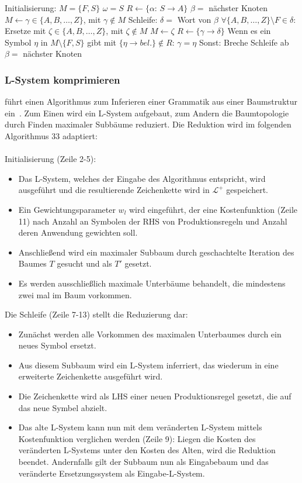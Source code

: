 \begin{algorithm}[caption={Inferieren eines L-Systems aus einer Baumstruktur}, label={alg2}]
    Initialisierung:
        $M=\{F,S\}$
        $\omega=S$
        $R \gets \{\alpha$: $S \rightarrow A\}$
        $\beta=$ nächster Knoten
        $M \gets \gamma \in \{A,B,\dots,Z\}$, mit $\gamma \notin M$
    Schleife:
        $\delta=$ Wort von $\beta$
        $\forall \{A,B,\dots,Z\} \setminus F \in \delta:$
        Ersetze mit $\zeta \in \{A,B,\dots,Z\}$, mit $\zeta \notin M$
        $M \gets \zeta$
        $R \gets \{\gamma\rightarrow\delta\}$
        Wenn es ein Symbol $\eta$ in $M\setminus\{F,S\}$ gibt mit $\{\eta \rightarrow bel.\} \notin R$:
            $\gamma=\eta$
        Sonst:
            Breche Schleife ab
        $\beta=$ nächster Knoten
\end{algorithm}

\subsubsection*{L-System komprimieren}
\citeauthor{guo_2020} führt einen Algorithmus zum Inferieren einer Grammatik aus einer Baumstruktur ein~\cite{guo_2020}.
Zum Einen wird ein L-System aufgebaut, zum Andern die Baumtopologie durch Finden maximaler Subbäume reduziert.
Die Reduktion wird im folgenden Algorithmus 33 adaptiert:\\~\\
Initialisierung (Zeile 2-5):
\begin{itemize}
    \item Das L-System, welches der Eingabe des Algorithmus entspricht, wird ausgeführt und
    die resultierende Zeichenkette wird in $\mathcal{L^+}$ gespeichert.
    \item Ein Gewichtungsparameter $w_l$ wird eingeführt, der eine Kostenfunktion (Zeile 11) nach Anzahl an Symbolen
    der RHS von Produktionsregeln und Anzahl deren Anwendung gewichten soll.
    \item Anschließend wird ein maximaler Subbaum durch geschachtelte Iteration des Baumes $T$ gesucht und als $T'$ gesetzt.
    \item Es werden ausschließlich maximale Unterbäume behandelt, die mindestens zwei mal im Baum vorkommen.
\end{itemize}
Die Schleife (Zeile 7-13) stellt die Reduzierung dar:
\begin{itemize}
    \item Zunächst werden alle Vorkommen des maximalen Unterbaumes durch ein neues Symbol ersetzt.
    \item Aus diesem Subbaum wird ein L-System inferriert, das wiederum in eine erweiterte Zeichenkette ausgeführt wird.
    \item Die Zeichenkette wird als LHS einer neuen Produktionsregel gesetzt, die auf das neue Symbel abzielt.
    \item Das alte L-System kann nun mit dem veränderten L-System mittels Kostenfunktion verglichen werden (Zeile 9):
    Liegen die Kosten des veränderten L-Systems unter den Kosten des Alten, wird die Reduktion beendet.
    Andernfalls gilt der Subbaum nun als Eingabebaum und das veränderte Ersetzungssystem als Eingabe-L-System.
\end{itemize}

